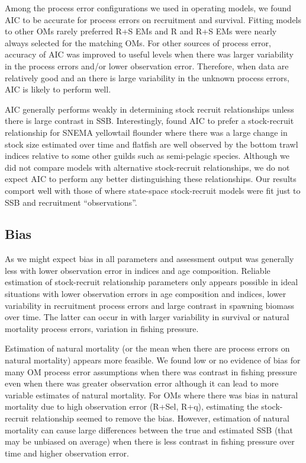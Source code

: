 \documentclass[
  12pt,
]{article}
\begin{document}
Among the process error configurations we used in operating models, we
found AIC to be accurate for process errors on recruitment and survival.
Fitting models to other OMs rarely preferred R+S EMs and R and R+S EMs
were nearly always selected for the matching OMs. For other sources of
process error, accuracy of AIC was improved to useful levels when there
was larger variability in the process errors and/or lower observation
error. Therefore, when data are relatively good and an there is large
variability in the unknown process errors, AIC is likely to perform
well.

AIC generally performs weakly in determining stock recruit relationships
unless there is large contrast in SSB. Interestingly,
\citet{milleretal16} found AIC to prefer a stock-recruit relationship
for SNEMA yellowtail flounder where there was a large change in stock
size estimated over time and flatfish are well observed by the bottom
trawl indices relative to some other guilds such as semi-pelagic
species. Although we did not compare models with alternative
stock-recruit relationships, we do not expect AIC to perform any better
distinguishing these relationships. Our results comport well with those
of \citet{devalpinehastings02} where state-space stock-recruit models
were fit just to SSB and recruitment ``observations''.

\hypertarget{bias-2}{%
\subsection*{Bias}\label{bias-2}}

As we might expect bias in all parameters and assessment output was
generally less with lower observation error in indices and age
composition. Reliable estimation of stock-recruit relationship
parameters only appears possible in ideal situations with lower
observation errors in age composition and indices, lower variability in
recruitment process errors and large contrast in spawning biomass over
time. The latter can occur in with larger variability in survival or
natural mortality process errors, variation in fishing pressure.

Estimation of natural mortality (or the mean when there are process
errors on natural mortality) appears more feasible. We found low or no
evidence of bias for many OM process error assumptions when there was
contrast in fishing pressure even when there was greater observation
error although it can lead to more variable estimates of natural
mortality. For OMs where there was bias in natural mortality due to high
observation error (R+Sel, R+q), estimating the stock-recruit
relationship seemed to remove the bias. However, estimation of natural
mortality can cause large differences between the true and estimated SSB
(that may be unbiased on average) when there is less contrast in fishing
pressure over time and higher observation error.
\end{document}
